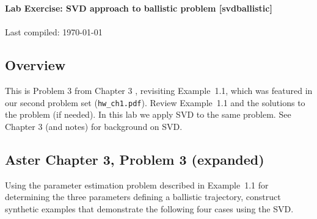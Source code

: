 \documentclass[11pt,titlepage,fleqn]{article}
\begin{document}

\begin{spacing}{1.2}
\centering
{\large \bf Lab Exercise: SVD approach to ballistic problem [svdballistic]} \\
\cltag\ \\
Last compiled: \today
\end{spacing}


\subsection*{Overview}

This is Problem 3 from Chapter 3 \citep{Aster}, revisiting Example~1.1, which was featured in our second problem set (\verb+hw_ch1.pdf+). Review Example~1.1 and the solutions to the problem (if needed). In this lab we apply SVD to the same problem. See Chapter 3 (and notes) for background on SVD.


\subsection*{Aster Chapter 3, Problem 3 (expanded)}

Using the parameter estimation problem described in Example~1.1 for determining the three parameters defining a ballistic trajectory, construct synthetic examples that demonstrate the following four cases using the SVD.
\end{document}
